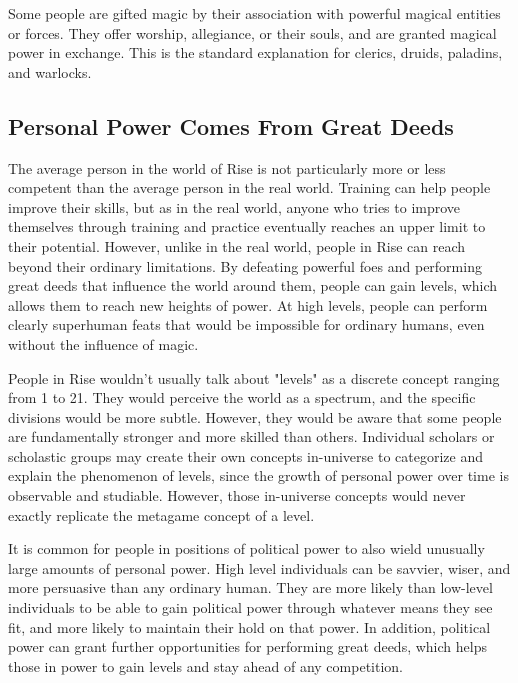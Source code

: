         Some people are gifted magic by their association with powerful magical entities or forces.
        They offer worship, allegiance, or their souls, and are granted magical power in exchange.
        This is the standard explanation for clerics, druids, paladins, and warlocks.

    \subsection{Personal Power Comes From Great Deeds}
        The average person in the world of Rise is not particularly more or less competent than the average person in the real world.
        Training can help people improve their skills, but as in the real world, anyone who tries to improve themselves through training and practice eventually reaches an upper limit to their potential.
        However, unlike in the real world, people in Rise can reach beyond their ordinary limitations.
        By defeating powerful foes and performing great deeds that influence the world around them, people can gain levels, which allows them to reach new heights of power.
        At high levels, people can perform clearly superhuman feats that would be impossible for ordinary humans, even without the influence of magic.

        People in Rise wouldn't usually talk about "levels" as a discrete concept ranging from 1 to 21.
        They would perceive the world as a spectrum, and the specific divisions would be more subtle.
        However, they would be aware that some people are fundamentally stronger and more skilled than others.
        Individual scholars or scholastic groups may create their own concepts in-universe to categorize and explain the phenomenon of levels, since the growth of personal power over time is observable and studiable. 
        However, those in-universe concepts would never exactly replicate the metagame concept of a level.

        It is common for people in positions of political power to also wield unusually large amounts of personal power.
        High level individuals can be savvier, wiser, and more persuasive than any ordinary human.
        They are more likely than low-level individuals to be able to gain political power through whatever means they see fit, and more likely to maintain their hold on that power.
        In addition, political power can grant further opportunities for performing great deeds, which helps those in power to gain levels and stay ahead of any competition.

